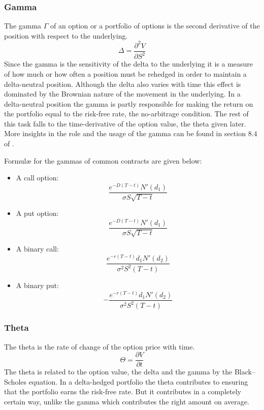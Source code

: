 \subsubsection{Gamma}
The gamma $\Gamma$ of an option or a portfolio of options is the second derivative of the position with respect to the underlying.
\begin{equation}
    \Delta = \frac{\partial^2 V}{\partial S^2}
\end{equation}
Since the gamma is the sensitivity of the delta to the underlying it is a measure of how much or how often a position must be rehedged in order to maintain a delta-neutral position. Although the delta also varies with time this effect is dominated by the Brownian nature of the movement in the underlying. In a delta-neutral position the gamma is partly responsible for making the return on the portfolio equal to the risk-free rate, the no-arbitrage condition. The rest of this task falls to the time-derivative of the option value, the theta given later. More insights in the role and the usage of the gamma can be found in section 8.4 of \cite{pw_iqf2ed_2007}.

Formul{\ae} for the gammas of common contracts are given below:
\begin{itemize}
	\setlength\itemsep{0em}
	\item A call option:
	\begin{equation}
		\frac{e^{-D(T-t)} N'(d_1)}{\sigma S \sqrt{T-t}}
	\end{equation}
	\item A put option:
	\begin{equation}
		\frac{e^{-D(T-t)} N'(d_1)}{\sigma S \sqrt{T-t}}
	\end{equation}
	\item A binary call:
	\begin{equation}
		\frac{e^{-r(T-t)} d_1 N'(d_2)}{\sigma^2 S^2 (T-t)}
	\end{equation}
	\item A binary put:
	\begin{equation}
		-\frac{e^{-r(T-t)} d_1 N'(d_2)}{\sigma^2 S^2 (T-t)}
	\end{equation}
\end{itemize}


\subsubsection{Theta}
The theta is the rate of change of the option price with time.
\begin{equation}
    \Theta = \frac{\partial V}{\partial t}
\end{equation}
The theta is related to the option value, the delta and the gamma by the Black–Scholes equation. In a delta-hedged portfolio the theta contributes to ensuring that the portfolio earns the risk-free rate. But it contributes in a completely certain way, unlike the gamma which contributes the right amount on average.


